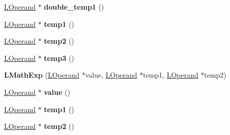 \begin{DoxyCompactItemize}
\item 
\hyperlink{classv8_1_1internal_1_1_l_operand}{L\+Operand} $\ast$ {\bfseries double\+\_\+temp1} ()\hypertarget{classv8_1_1internal_1_1_l_math_exp_a45f7e0a742e9c92559cc86f466291f20}{}\label{classv8_1_1internal_1_1_l_math_exp_a45f7e0a742e9c92559cc86f466291f20}

\item 
\hyperlink{classv8_1_1internal_1_1_l_operand}{L\+Operand} $\ast$ {\bfseries temp1} ()\hypertarget{classv8_1_1internal_1_1_l_math_exp_a430c8c030cbaad33b264a77b03e0db75}{}\label{classv8_1_1internal_1_1_l_math_exp_a430c8c030cbaad33b264a77b03e0db75}

\item 
\hyperlink{classv8_1_1internal_1_1_l_operand}{L\+Operand} $\ast$ {\bfseries temp2} ()\hypertarget{classv8_1_1internal_1_1_l_math_exp_adb7bff0a3a668396d3393908dab289df}{}\label{classv8_1_1internal_1_1_l_math_exp_adb7bff0a3a668396d3393908dab289df}

\item 
\hyperlink{classv8_1_1internal_1_1_l_operand}{L\+Operand} $\ast$ {\bfseries temp3} ()\hypertarget{classv8_1_1internal_1_1_l_math_exp_aa689ca2b1468a842669c13b104c5b7b1}{}\label{classv8_1_1internal_1_1_l_math_exp_aa689ca2b1468a842669c13b104c5b7b1}

\item 
{\bfseries L\+Math\+Exp} (\hyperlink{classv8_1_1internal_1_1_l_operand}{L\+Operand} $\ast$value, \hyperlink{classv8_1_1internal_1_1_l_operand}{L\+Operand} $\ast$temp1, \hyperlink{classv8_1_1internal_1_1_l_operand}{L\+Operand} $\ast$temp2)\hypertarget{classv8_1_1internal_1_1_l_math_exp_a32a00730bc7d316fb3699ba289720b97}{}\label{classv8_1_1internal_1_1_l_math_exp_a32a00730bc7d316fb3699ba289720b97}

\item 
\hyperlink{classv8_1_1internal_1_1_l_operand}{L\+Operand} $\ast$ {\bfseries value} ()\hypertarget{classv8_1_1internal_1_1_l_math_exp_a59d6185f1b9e035a269046376b4432b8}{}\label{classv8_1_1internal_1_1_l_math_exp_a59d6185f1b9e035a269046376b4432b8}

\item 
\hyperlink{classv8_1_1internal_1_1_l_operand}{L\+Operand} $\ast$ {\bfseries temp1} ()\hypertarget{classv8_1_1internal_1_1_l_math_exp_a430c8c030cbaad33b264a77b03e0db75}{}\label{classv8_1_1internal_1_1_l_math_exp_a430c8c030cbaad33b264a77b03e0db75}

\item 
\hyperlink{classv8_1_1internal_1_1_l_operand}{L\+Operand} $\ast$ {\bfseries temp2} ()\hypertarget{classv8_1_1internal_1_1_l_math_exp_adb7bff0a3a668396d3393908dab289df}{}\label{classv8_1_1internal_1_1_l_math_exp_adb7bff0a3a668396d3393908dab289df}


\end{DoxyCompactItemize}
